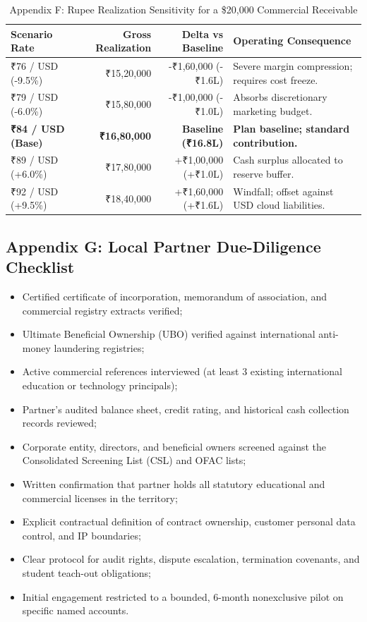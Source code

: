 \begin{table}[t]
\centering
\small
\caption{Appendix F: Rupee Realization Sensitivity for a \$20,000 Commercial Receivable}
\label{tab:app_fx_table}
\begin{tabularx}{\textwidth}{p{3.2cm} r r X}
\toprule
\textbf{Scenario Rate} & \textbf{Gross Realization} & \textbf{Delta vs Baseline} & \textbf{Operating Consequence} \\
\midrule
₹76 / USD (-9.5\%) & ₹15,20,000 & -₹1,60,000 (-₹1.6L) & Severe margin compression; requires cost freeze. \\
₹79 / USD (-6.0\%) & ₹15,80,000 & -₹1,00,000 (-₹1.0L) & Absorbs discretionary marketing budget. \\
\textbf{₹84 / USD (Base)} & \textbf{₹16,80,000} & \textbf{Baseline (₹16.8L)} & \textbf{Plan baseline; standard contribution.} \\
₹89 / USD (+6.0\%) & ₹17,80,000 & +₹1,00,000 (+₹1.0L) & Cash surplus allocated to reserve buffer. \\
₹92 / USD (+9.5\%) & ₹18,40,000 & +₹1,60,000 (+₹1.6L) & Windfall; offset against USD cloud liabilities. \\
\bottomrule
\end{tabularx}
\end{table}

\subsection{Appendix G: Local Partner Due-Diligence Checklist}

\begin{itemize}
    \item Certified certificate of incorporation, memorandum of association, and commercial registry extracts verified;
    \item Ultimate Beneficial Ownership (UBO) verified against international anti-money laundering registries;
    \item Active commercial references interviewed (at least 3 existing international education or technology principals);
    \item Partner's audited balance sheet, credit rating, and historical cash collection records reviewed;
    \item Corporate entity, directors, and beneficial owners screened against the Consolidated Screening List (CSL) and OFAC lists;
    \item Written confirmation that partner holds all statutory educational and commercial licenses in the territory;
    \item Explicit contractual definition of contract ownership, customer personal data control, and IP boundaries;
    \item Clear protocol for audit rights, dispute escalation, termination covenants, and student teach-out obligations;
    \item Initial engagement restricted to a bounded, 6-month nonexclusive pilot on specific named accounts.
\end{itemize}

